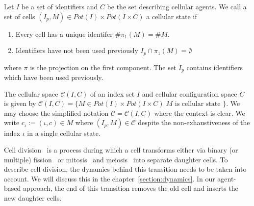 \begin{definition}
    \label{def:cellular-state}
    Let $I$ be a set of identifiers and $C$ be the set describing cellular agents.
    We call a set of cells $(I_p,M)\in Pot(I)\times Pot(I\times C)$ a cellular state if
    \begin{enumerate}
        \item Every cell has a unique identifer $\#\pi_1(M)=\#M$.
        \item Identifiers have not been used previously $I_p\cap\pi_1(M)=\emptyset$
    \end{enumerate}
    where $\pi$ is the projection on the first component.
    The set $I_p$ contains identifiers which have been used previously.
\end{definition}

\begin{definition}
    \label{def:cellular-space}
    The cellular space $\mathscr{C}(I, C)$ of an index set $I$ and cellular configuration space $C$
    is given by
    $\mathscr{C}(I,C) = \{M\in Pot(I)\times Pot(I\times C) | M \text{ is cellular state }\}$.
    We may choose the simplified notation $\mathscr{C} = \mathscr{C}(I, C)$ where the context is
    clear.
    We write $c_\iota:=(\iota,c)\in M$ where $(I_p,M)\in\mathscr{C}$ despite the non-exhaustiveness
    of the index $\iota$ in a single cellular state.
\end{definition}

Cell division~\cite{bhlitem268752} is a process during which a cell transforms either via binary
(or multiple) fission~\cite{Biov2014} or mitosis~\cite{Ilowiecki1981,von1835resp} and
meiosis~ into separate
daughter cells.
To describe cell division, the dynamics behind this transition needs to be taken into account.
We will discuss this in the chapter~\ref{section:dynamics}.
In our agent-based approach, the end of this transition removes the old cell and inserts the new
daughter cells.

